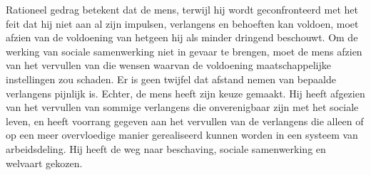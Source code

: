 \begin{blockquotebox}
Rationeel gedrag betekent dat de mens, terwijl hij wordt geconfronteerd met het feit dat hij niet aan al zijn impulsen, verlangens en behoeften kan voldoen, moet afzien van de voldoening van hetgeen hij als minder dringend beschouwt. Om de werking van sociale samenwerking niet in gevaar te brengen, moet de mens afzien van het vervullen van die wensen waarvan de voldoening maatschappelijke instellingen zou schaden. Er is geen twijfel dat afstand nemen van bepaalde verlangens pijnlijk is. Echter, de mens heeft zijn keuze gemaakt. Hij heeft afgezien van het vervullen van sommige verlangens die onverenigbaar zijn met het sociale leven, en heeft voorrang gegeven aan het vervullen van de verlangens die alleen of op een meer overvloedige manier gerealiseerd kunnen worden in een systeem van arbeidsdeling. Hij heeft de weg naar beschaving, sociale samenwerking en welvaart gekozen.\footnotemark
\end{blockquotebox}

